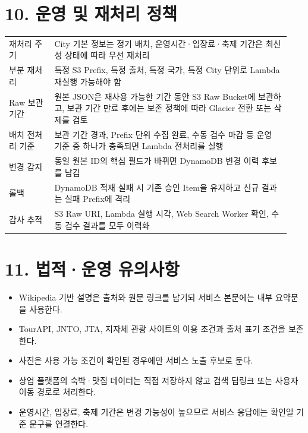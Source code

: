 \documentclass[12pt,a4paper]{article}
\newcommand{\DocNeedspace}[1]{\par\ifdim\dimexpr\pagegoal-\pagetotal\relax<#1\newpage\fi}
\begin{document}
\newpage

\DocNeedspace{10\baselineskip}
\section*{10. 운영 및 재처리 정책}


\DocNeedspace{20\baselineskip}
\begin{small}
\begin{longtable}{@{}>{\RaggedRight\arraybackslash}m{0.158\linewidth}>{\RaggedRight\arraybackslash}m{0.782\linewidth}@{}}
\toprule
\multicolumn{1}{>{\centering\arraybackslash}m{0.158\linewidth}}{\textbf{항목}} & \multicolumn{1}{>{\centering\arraybackslash}m{0.782\linewidth}}{\textbf{정책}} \\
\midrule
\endhead
재처리 주기 & City 기본 정보는 정기 배치, 운영시간·입장료·축제 기간은 최신성 상태에 따라 우선 재처리 \\
부분 재처리 & 특정 S3 Prefix, 특정 출처, 특정 국가, 특정 City 단위로 Lambda 재실행 가능해야 함 \\
Raw 보관 기간 & 원본 JSON은 재사용 가능한 기간 동안 S3 Raw Bucket에 보관하고, 보관 기간 만료 후에는 보존 정책에 따라 Glacier 전환 또는 삭제를 검토 \\
배치 전처리 기준 & 보관 기간 경과, Prefix 단위 수집 완료, 수동 검수 마감 등 운영 기준 중 하나가 충족되면 Lambda 전처리를 실행 \\
변경 감지 & 동일 원본 ID의 핵심 필드가 바뀌면 DynamoDB 변경 이력 후보를 남김 \\
롤백 & DynamoDB 적재 실패 시 기존 승인 Item을 유지하고 신규 결과는 실패 Prefix에 격리 \\
감사 추적 & S3 Raw URI, Lambda 실행 시각, Web Search Worker 확인, 수동 검수 결과를 모두 이력화 \\
\bottomrule
\end{longtable}
\end{small}


\newpage

\DocNeedspace{10\baselineskip}
\section*{11. 법적·운영 유의사항}


\begin{itemize}
\item Wikipedia 기반 설명은 출처와 원문 링크를 남기되 서비스 본문에는 내부 요약문을 사용한다.
\item TourAPI, JNTO, JTA, 지자체 관광 사이트의 이용 조건과 출처 표기 조건을 보존한다.
\item 사진은 사용 가능 조건이 확인된 경우에만 서비스 노출 후보로 둔다.
\item 상업 플랫폼의 숙박·맛집 데이터는 직접 저장하지 않고 검색 딥링크 또는 사용자 이동 경로로 처리한다.
\item 운영시간, 입장료, 축제 기간은 변경 가능성이 높으므로 서비스 응답에는 확인일 기준 문구를 연결한다.
\end{itemize}
\end{document}
